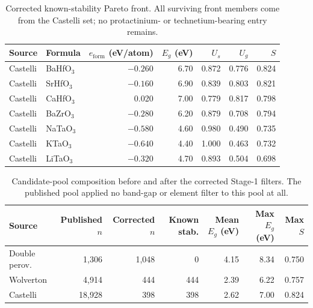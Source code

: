\begin{table}[htbp]
\centering
\small
\caption{Corrected known-stability Pareto front. All surviving front members come from the Castelli set; no protactinium- or technetium-bearing entry remains.}
\label{tab:a1_corrected_pareto}
\begin{tabular}{llrrrrr}
\toprule
Source & Formula & $e_{\mathrm{form}}$ (eV/atom) & $E_g$ (eV) & $U_s$ & $U_g$ & $S$ \\
\midrule
Castelli & BaHfO$_{3}$ & $-0.260$ & 6.70 & 0.872 & 0.776 & 0.824 \\
Castelli & SrHfO$_{3}$ & $-0.160$ & 6.90 & 0.839 & 0.803 & 0.821 \\
Castelli & CaHfO$_{3}$ & 0.020 & 7.00 & 0.779 & 0.817 & 0.798 \\
Castelli & BaZrO$_{3}$ & $-0.280$ & 6.20 & 0.879 & 0.708 & 0.794 \\
Castelli & NaTaO$_{3}$ & $-0.580$ & 4.60 & 0.980 & 0.490 & 0.735 \\
Castelli & KTaO$_{3}$ & $-0.640$ & 4.40 & 1.000 & 0.463 & 0.732 \\
Castelli & LiTaO$_{3}$ & $-0.320$ & 4.70 & 0.893 & 0.504 & 0.698 \\
\bottomrule
\end{tabular}
\end{table}

\begin{table}[htbp]
\centering
\footnotesize
\setlength{\tabcolsep}{4pt}
\caption{Candidate-pool composition before and after the corrected Stage-1 filters. The published pool applied no band-gap or element filter to this pool at all.}
\label{tab:a1_corrected_pool}
\begin{tabular}{lrrrrrr}
\toprule
Source & Published $n$ & Corrected $n$ & Known stab. & Mean $E_g$ (eV) & Max $E_g$ (eV) & Max $S$ \\
\midrule
Double perov. & 1{,}306 & 1{,}048 & 0 & 4.15 & 8.34 & 0.750 \\
Wolverton & 4{,}914 & 444 & 444 & 2.39 & 6.22 & 0.757 \\
Castelli & 18{,}928 & 398 & 398 & 2.62 & 7.00 & 0.824 \\
\bottomrule
\end{tabular}
\end{table}

